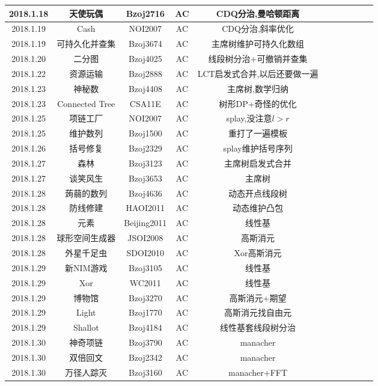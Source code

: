 \documentclass[landscape]{article}
\begin{document}
\begin{longtable}{ccccccccccc}
  \hline
  2018.1.18 & 天使玩偶 & Bzoj2716 & AC & CDQ分治,曼哈顿距离\\
  \hline
  2018.1.19 & Cash & NOI2007 & AC & CDQ分治,斜率优化\\
  \hline
  2018.1.19 & 可持久化并查集 & Bzoj3674 & AC & 主席树维护可持久化数组\\
  \hline
  2018.1.20 & 二分图 & Bzoj4025 & AC & 线段树分治+可撤销并查集\\
  \hline
  2018.1.22 & 资源运输 & Bzoj2888 & AC & LCT启发式合并,以后还要做一遍\\
  \hline
  2018.1.23 & 神秘数 & Bzoj4408 & AC & 主席树,数学归纳\\
  \hline
  2018.1.23 & Connected Tree & CSA11E & AC & 树形DP+奇怪的优化\\
  \hline
  2018.1.25 & 项链工厂 & NOI2007 & AC & splay,没注意$l>r$\\
  \hline
  2018.1.25 & 维护数列 & Bzoj1500 & AC & 重打了一遍模板\\
  \hline
  2018.1.26 & 括号修复 & Bzoj2329 & AC & splay维护括号序列\\
  \hline
  2018.1.27 & 森林 & Bzoj3123 & AC & 主席树启发式合并\\
  \hline
  2018.1.27 & 谈笑风生 & Bzoj3653 & AC & 主席树\\
  \hline
  2018.1.28 & 蒟蒻的数列 & Bzoj4636 & AC & 动态开点线段树\\
  \hline
  2018.1.28 & 防线修建 & HAOI2011 & AC & 动态维护凸包\\
  \hline
  2018.1.28 & 元素 & Beijing2011 & AC & 线性基\\
  \hline
  2018.1.28 & 球形空间生成器 & JSOI2008 & AC & 高斯消元\\
  \hline
  2018.1.28 & 外星千足虫 & SDOI2010 & AC & Xor高斯消元\\
  \hline
  2018.1.29 & 新NIM游戏 & Bzoj3105 & AC & 线性基\\
  \hline
  2018.1.29 & Xor & WC2011 & AC & 线性基\\
  \hline
  2018.1.29 & 博物馆 & Bzoj3270 & AC & 高斯消元+期望\\
  \hline
  2018.1.29 & Light & Bzoj1770 & AC & 高斯消元找自由元\\
  \hline
  2018.1.29 & Shallot & Bzoj4184 & AC & 线性基套线段树分治\\
  \hline
  2018.1.30 & 神奇项链 & Bzoj3790 & AC & manacher\\
  \hline
  2018.1.30 & 双倍回文 & Bzoj2342 & AC & manacher\\
  \hline
  2018.1.30 & 万径人踪灭 & Bzoj3160 & AC & manacher+FFT\\

\end{longtable}
\end{document}

